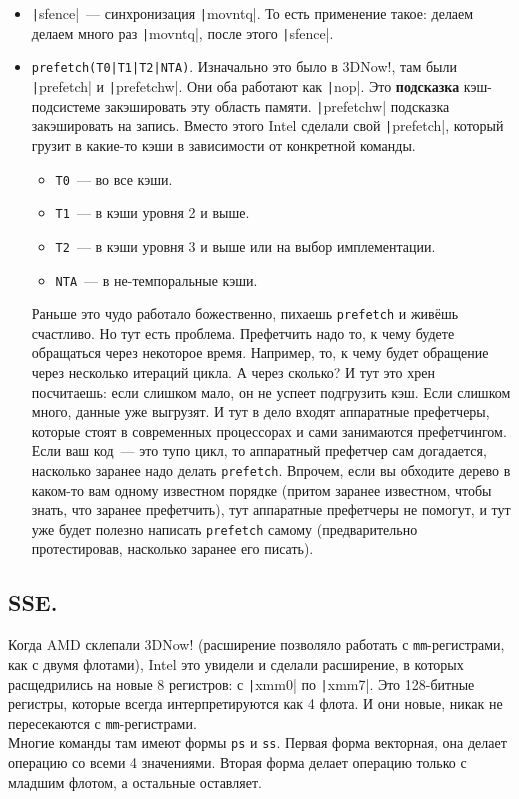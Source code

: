 \documentclass{article}
\begin{document}
\begin{itemize}
        \item \texttt|sfence|~--- синхронизация \texttt|movntq|. То есть применение такое: делаем делаем много раз \texttt|movntq|, после этого \texttt|sfence|.
        \item \Verb/prefetch(T0|T1|T2|NTA)/. Изначально это было в 3DNow!, там были \texttt|prefetch| и \texttt|prefetchw|. Они оба работают как \texttt|nop|. Это \textbf{подсказка} кэш-подсистеме закэшировать эту область памяти. \texttt|prefetchw| подсказка закэшировать на запись. Вместо этого Intel сделали свой \texttt|prefetch|, который грузит в какие-то кэши в зависимости от конкретной команды.
        \begin{itemize}
            \item \Verb|T0|~--- во все кэши.
            \item \Verb|T1|~--- в кэши уровня 2 и выше.
            \item \Verb|T2|~--- в кэши уровня 3 и выше или на выбор имплементации.
            \item \Verb|NTA|~--- в не-темпоральные кэши.
        \end{itemize}
        Раньше это чудо работало божественно, пихаешь \Verb|prefetch| и живёшь счастливо. Но тут есть проблема. Префетчить надо то, к чему будете обращаться через некоторое время. Например, то, к чему будет обращение через несколько итераций цикла. А через сколько? И тут это хрен посчитаешь: если слишком мало, он не успеет подгрузить кэш. Если слишком много, данные уже выгрузят. И тут в дело входят аппаратные префетчеры, которые стоят в современных процессорах и сами занимаются префетчингом. Если ваш код~--- это тупо цикл, то аппаратный префетчер сам догадается, насколько заранее надо делать \Verb|prefetch|. Впрочем, если вы обходите дерево в каком-то вам одному известном порядке (притом заранее известном, чтобы знать, что заранее префетчить), тут аппаратные префетчеры не помогут, и тут уже будет полезно написать \Verb|prefetch| самому (предварительно протестировав, насколько заранее его писать).
    \end{itemize}
    \subsection{SSE.}
    Когда AMD склепали 3DNow! (расширение позволяло работать с \Verb|mm|-регистрами, как с двумя флотами), Intel это увидели и сделали расширение, в которых расщедрились на новые 8 регистров: с \texttt|xmm0| по \texttt|xmm7|. Это 128-битные регистры, которые всегда интерпретируются как 4 флота. И они новые, никак не пересекаются с \Verb|mm|-регистрами.\\
    Многие команды там имеют формы \Verb|ps| и \Verb|ss|. Первая форма векторная, она делает операцию со всеми 4 значениями. Вторая форма делает операцию только с младшим флотом, а остальные оставляет.
\end{document}
